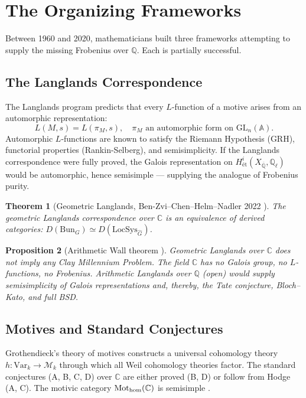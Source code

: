 \documentclass[12pt]{article}
\newtheorem{theorem}{Theorem}
\newtheorem{proposition}[theorem]{Proposition}
\theoremstyle{definition}
\theoremstyle{remark}
\begin{document}
\section{The Organizing Frameworks}

Between 1960 and 2020, mathematicians built three frameworks attempting to
supply the missing Frobenius over $\mathbb{Q}$. Each is partially successful.

\subsection{The Langlands Correspondence}

The Langlands program \cite{langlands} predicts that every $L$-function
of a motive arises from an automorphic representation:
\[
L(M,s) = L(\pi_M, s), \quad \pi_M \text{ an automorphic form on }
\mathrm{GL}_n(\mathbb{A}).
\]
Automorphic $L$-functions are known to satisfy the Riemann Hypothesis
(GRH), functorial properties (Rankin-Selberg), and semisimplicity.
If the Langlands correspondence were fully proved, the Galois representation
on $H^i_{\text{ét}}(X_{\overline{\mathbb{Q}}},\mathbb{Q}_\ell)$ would be
automorphic, hence semisimple --- supplying the analogue of Frobenius purity.

\begin{theorem}[Geometric Langlands, Ben-Zvi--Chen--Helm--Nadler 2022
\cite{bzhn2022}]
The geometric Langlands correspondence over $\mathbb{C}$ is an equivalence
of derived categories:
$D(\mathrm{Bun}_G) \simeq D(\mathrm{LocSys}_{\hat G})$.
\end{theorem}

\begin{proposition}[Arithmetic Wall theorem \cite{langlands}]
\label{prop:wall}
Geometric Langlands over $\mathbb{C}$ does not imply any Clay Millennium
Problem. The field $\mathbb{C}$ has no Galois group, no $L$-functions,
no Frobenius. Arithmetic Langlands over $\mathbb{Q}$ (open) would supply
semisimplicity of Galois representations and, thereby, the Tate conjecture,
Bloch--Kato, and full BSD.
\end{proposition}

\subsection{Motives and Standard Conjectures}

Grothendieck's theory of motives \cite{motives} constructs a universal
cohomology theory $h: \mathrm{Var}_k \to \mathcal{M}_k$ through which all
Weil cohomology theories factor. The standard conjectures (A, B, C, D)
over $\mathbb{C}$ are either proved (B, D) or follow from Hodge (A, C).
The motivic category $\mathrm{Mot}_{\rm hom}(\mathbb{C})$ is semisimple
\cite{motives}.
\end{document}
